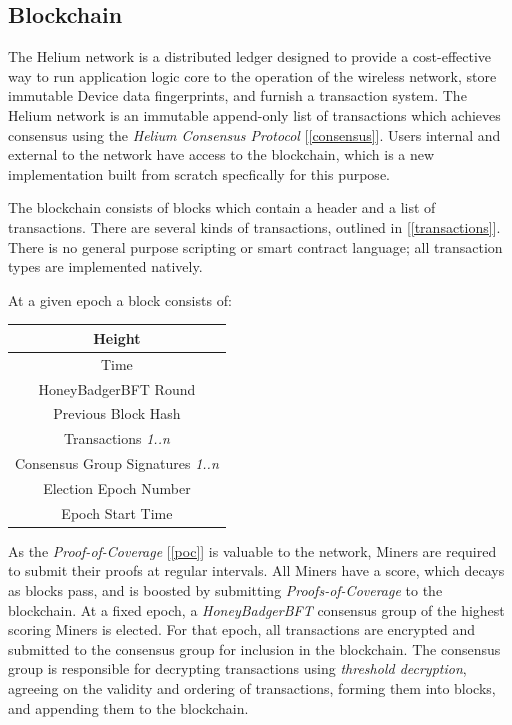 \documentclass[10pt, nonatbib, nocopyrightspace, reprint]{sigplanconf}
\newcommand{\secref}[1]{[\autoref{#1}]}
\begin{document}
\subsection{Blockchain} \label{blockchain}

The Helium network is a distributed ledger designed to provide a cost-effective way to run application logic core to the operation of the wireless network, store immutable Device data fingerprints, and furnish a transaction system. The Helium network is an immutable append-only list of transactions which achieves consensus using the \emph{Helium Consensus Protocol} \secref{consensus}. Users internal and external to the network have access to the blockchain, which is a new implementation built from scratch specfically for this purpose.

The blockchain consists of blocks which contain a header and a list of transactions. There are several kinds of transactions, outlined in \secref{transactions}. There is no general purpose scripting or smart contract language; all transaction types are implemented natively.

At a given epoch a block consists of:

\begin{center}
    \begin{tabular}{|c|}
         \hline
         Height \\
         \hline
         Time \\
         \hline
         HoneyBadgerBFT Round \\
         \hline
         Previous Block Hash \\
         \hline
         Transactions \emph{1..n} \\
         \hline
         Consensus Group Signatures \emph{1..n} \\
         \hline
         Election Epoch Number \\
         \hline
         Epoch Start Time \\
         \hline
    \end{tabular}
\end{center}

As the \emph{Proof-of-Coverage} \secref{poc} is valuable to the network, Miners are required to submit their proofs at regular intervals. All Miners have a score, which decays as blocks pass, and is boosted by submitting \emph{Proofs-of-Coverage} to the blockchain. At a fixed epoch, a \emph{HoneyBadgerBFT} \cite{honeybadger} consensus group of the highest scoring Miners is elected. For that epoch, all transactions are encrypted and submitted to the consensus group for inclusion in the blockchain. The consensus group is responsible for decrypting transactions using \emph{threshold decryption}, agreeing on the validity and ordering of transactions, forming them into blocks, and appending them to the blockchain.
\end{document}
